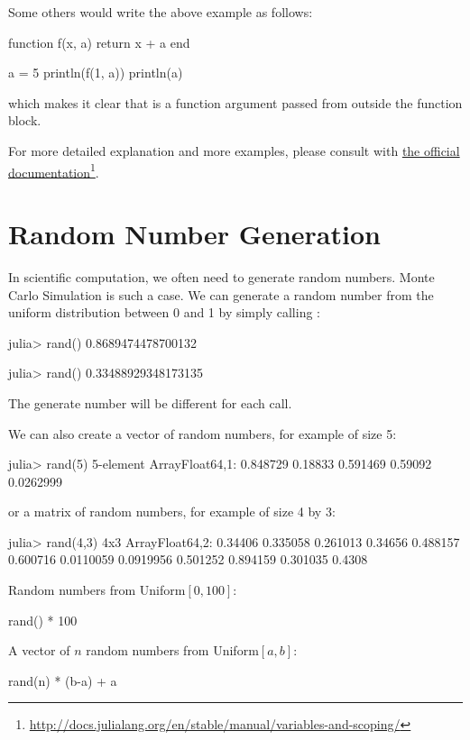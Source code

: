 Some others would write the above example as follows:
\begin{code}
function f(x, a)
    return x + a
end

a = 5
println(f(1, a))
println(a)
\end{code}
\noindent which makes it clear that  is a function argument passed from outside the function block.

For more detailed explanation and more examples, please consult with \href{http://docs.julialang.org/en/stable/manual/variables-and-scoping/}{the official documentation}\footnote{\url{http://docs.julialang.org/en/stable/manual/variables-and-scoping/}}.




\section{Random Number Generation}

In scientific computation, we often need to generate random numbers. Monte Carlo Simulation is such a case. We can generate a random number from the uniform distribution between 0 and 1 by simply calling :
\begin{code}
julia> rand()
0.8689474478700132

julia> rand()
0.33488929348173135
\end{code}
\noindent The generate number will be different for each call.

We can also create a vector of random numbers, for example of size 5:
\begin{code}
julia> rand(5)
5-element Array{Float64,1}:
 0.848729
 0.18833
 0.591469
 0.59092
 0.0262999
\end{code}
\noindent or a matrix of random numbers, for example of size 4 by 3:
\begin{code}
julia> rand(4,3)
4x3 Array{Float64,2}:
 0.34406    0.335058   0.261013
 0.34656    0.488157   0.600716
 0.0110059  0.0919956  0.501252
 0.894159   0.301035   0.4308
\end{code}

Random numbers from Uniform$[0,100]$:
\begin{code}
rand() * 100
\end{code}
\noindent A vector of $n$ random numbers from Uniform$[a,b]$:
\begin{code}
rand(n) * (b-a) + a
\end{code}

